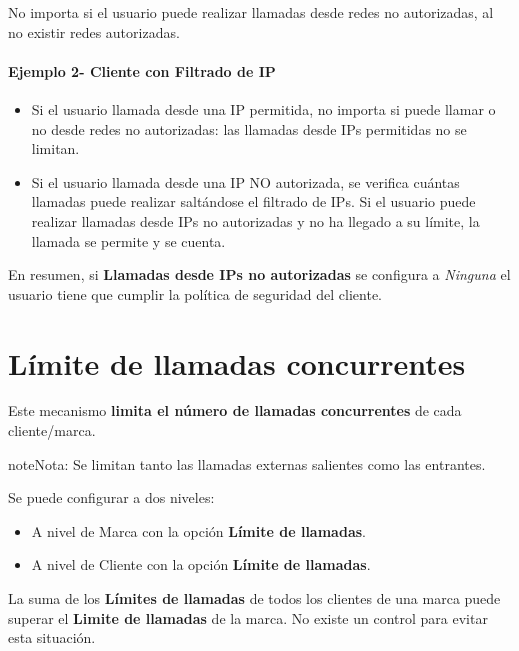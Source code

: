 \documentclass[letterpaper,10pt,spanish]{sphinxmanual}
\begin{document}
No importa si el usuario puede realizar llamadas desde redes no autorizadas, al no existir redes autorizadas.
\paragraph{Ejemplo 2- Cliente con Filtrado de IP}
\begin{itemize}
\item {} 
Si el usuario llamada desde una IP permitida, no importa si puede llamar o no desde redes no autorizadas: las llamadas desde IPs permitidas no se limitan.

\item {} 
Si el usuario llamada desde una IP NO autorizada, se verifica cuántas llamadas puede realizar saltándose el filtrado de IPs. Si el usuario puede realizar llamadas desde IPs no autorizadas y no ha llegado a su límite, la llamada se permite y se cuenta.

\end{itemize}

En resumen, si \textbf{Llamadas desde IPs no autorizadas} se configura a \emph{Ninguna} el usuario tiene que cumplir la política de seguridad del cliente.


\section{Límite de llamadas concurrentes}
\label{security_and_maintenance/security/concurrent_call_limit::doc}\label{security_and_maintenance/security/concurrent_call_limit:concurrent-call-limit}
Este mecanismo \textbf{limita el número de llamadas concurrentes} de cada cliente/marca.

\begin{notice}{note}{Nota:}
Se limitan tanto las llamadas externas salientes como las entrantes.
\end{notice}

Se puede configurar a dos niveles:
\begin{itemize}
\item {} 
A nivel de Marca con la opción \textbf{Límite de llamadas}.

\item {} 
A nivel de Cliente con la opción \textbf{Límite de llamadas}.

\end{itemize}

La suma de los \textbf{Límites de llamadas} de todos los clientes de una marca puede superar el \textbf{Limite de llamadas} de la marca. No existe un control para evitar esta situación.
\end{document}
